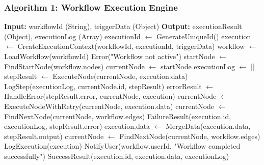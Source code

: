 \documentclass[12pt,a4paper]{article}
\begin{document}
\subsubsection{Algorithm 1: Workflow Execution Engine}
\begin{algorithm}
\caption{WorkflowExecute(workflowId, triggerData)}
\begin{algorithmic}[1]
\STATE \textbf{Input:} workflowId (String), triggerData (Object)
\STATE \textbf{Output:} executionResult (Object), executionLog (Array)
\STATE
\STATE executionId $\leftarrow$ GenerateUniqueId()
\STATE execution $\leftarrow$ CreateExecutionContext(workflowId, executionId, triggerData)
\STATE workflow $\leftarrow$ LoadWorkflow(workflowId)
    \RETURN Error("Workflow not active")
\ENDIF
\STATE startNode $\leftarrow$ FindStartNode(workflow.nodes)
\STATE currentNode $\leftarrow$ startNode
\STATE executionLog $\leftarrow$ []
    \STATE stepResult $\leftarrow$ ExecuteNode(currentNode, execution.data)
    \STATE LogStep(executionLog, currentNode.id, stepResult)
        \STATE errorResult $\leftarrow$ HandleError(stepResult.error, currentNode, execution)
            \STATE currentNode $\leftarrow$ ExecuteNodeWithRetry(currentNode, execution.data)
            \STATE currentNode $\leftarrow$ FindNextNode(currentNode, workflow.edges)
            \RETURN FailureResult(execution.id, executionLog, stepResult.error)
        \ENDIF
    \ELSE
        \STATE execution.data $\leftarrow$ MergeData(execution.data, stepResult.output)
        \STATE currentNode $\leftarrow$ FindNextNode(currentNode, workflow.edges)
    \ENDIF
\ENDWHILE
\STATE LogExecution(execution)
\STATE NotifyUser(workflow.userId, "Workflow completed successfully")
\RETURN SuccessResult(execution.id, execution.data, executionLog)
\end{algorithmic}
\end{algorithm}

\newpage
\end{document}
